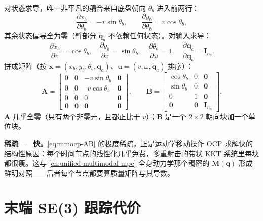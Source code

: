 \begin{derivation}[流图雅可比]
对状态求导，唯一非平凡的耦合来自底盘朝向 $\theta_b$ 进入前两行：
\begin{equation}
  \frac{\partial\dot x_b}{\partial\theta_b}=-v\sin\theta_b,\qquad
  \frac{\partial\dot y_b}{\partial\theta_b}=v\cos\theta_b,
  \label{eq:mmocp-Adetail}
\end{equation}
其余状态偏导全为零（臂部分 $\dot{\mathbf q}_a$ 不依赖任何状态）。对输入求导：
\begin{equation}
  \frac{\partial\dot x_b}{\partial v}=\cos\theta_b,\quad
  \frac{\partial\dot y_b}{\partial v}=\sin\theta_b,\quad
  \frac{\partial\dot\theta_b}{\partial\omega}=1,\quad
  \frac{\partial\dot{\mathbf q}_a}{\partial\dot{\mathbf q}_a}=\mathbf I_{n_a}.
  \label{eq:mmocp-Bdetail}
\end{equation}
拼成矩阵（按 $\mathbf x=(x_b,y_b,\theta_b,\mathbf q_a)$、$\mathbf u=(v,\omega,\dot{\mathbf q}_a)$ 排序）：
\begin{equation}
  \mathbf A=\begin{bmatrix}
  0&0&-v\sin\theta_b&\mathbf 0\\
  0&0&\ \ v\cos\theta_b&\mathbf 0\\
  0&0&0&\mathbf 0\\
  \mathbf 0&\mathbf 0&\mathbf 0&\mathbf 0
  \end{bmatrix},
  \qquad
  \mathbf B=\begin{bmatrix}
  \cos\theta_b&0&\mathbf 0\\
  \sin\theta_b&0&\mathbf 0\\
  0&1&\mathbf 0\\
  \mathbf 0&\mathbf 0&\mathbf I_{n_a}
  \end{bmatrix}.
  \label{eq:mmocp-AB}
\end{equation}
$\mathbf A$ 几乎全零（只有两个非零元，且都正比于 $v$）；$\mathbf B$ 是一个 $2\times2$ 朝向块加一个单位块。
\end{derivation}

\begin{insight}
\textbf{稀疏 $=$ 快。}\;\cref{eq:mmocp-AB} 的极度稀疏，正是运动学移动操作 OCP 求解快的结构性原因：每个时间节点的线性化几乎免费，多重射击的带状 KKT 系统里每块都很瘦。这与 \cref{ch:unified-multimodal-mpc} 全身动力学那个稠密的 $\mathbf M(\mathbf q)$ 形成鲜明对照——后者每个节点都要算质量矩阵与其导数。
\end{insight}

\section{末端 SE(3) 跟踪代价}
\label{sec:mmocp-cost}

